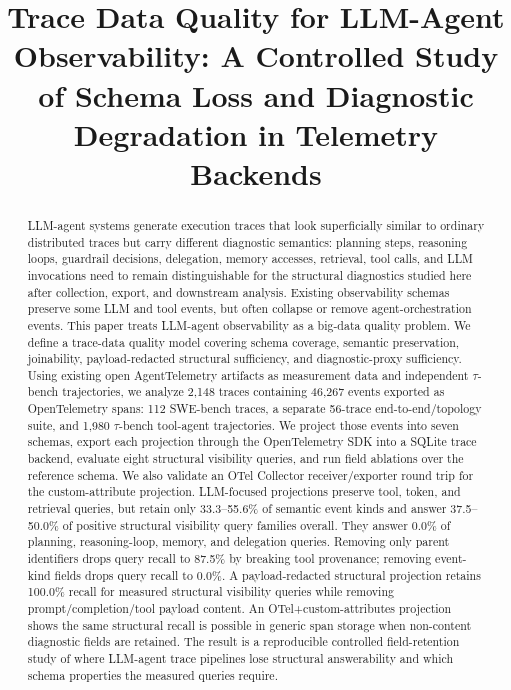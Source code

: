 \documentclass[conference]{IEEEtran}
\begin{document}
\title{Trace Data Quality for LLM-Agent Observability:
A Controlled Study of Schema Loss and Diagnostic
Degradation in Telemetry Backends}

\author{
}

\maketitle

\begin{abstract}
LLM-agent systems generate execution traces that look superficially
similar to ordinary distributed traces but carry different diagnostic
semantics: planning steps, reasoning loops, guardrail decisions,
delegation, memory accesses, retrieval, tool calls, and LLM invocations
need to remain distinguishable for the structural diagnostics studied
here after collection, export, and downstream analysis. Existing
observability schemas preserve some LLM and tool events, but often
collapse or remove agent-orchestration events. This paper treats
LLM-agent observability as a big-data quality problem. We define a
trace-data quality model covering schema coverage, semantic
preservation, joinability, payload-redacted structural sufficiency, and
diagnostic-proxy sufficiency. Using existing open AgentTelemetry
artifacts as measurement data and independent $\tau$-bench
trajectories, we analyze 2,148 traces containing 46,267 events exported
as OpenTelemetry spans: 112 SWE-bench traces, a separate 56-trace
end-to-end/topology suite, and 1,980 $\tau$-bench tool-agent
trajectories. We project those events into seven schemas, export each
projection through the OpenTelemetry SDK into a SQLite trace backend,
evaluate eight structural visibility queries, and run field ablations
over the reference schema. We also validate an OTel Collector
receiver/exporter round trip for the custom-attribute projection.
LLM-focused projections preserve tool, token, and retrieval queries, but
retain only 33.3--55.6\% of semantic event kinds and answer
37.5--50.0\% of positive structural visibility query families overall.
They answer 0.0\% of planning, reasoning-loop, memory, and delegation
queries. Removing only parent identifiers drops query recall to 87.5\%
by breaking tool provenance; removing event-kind fields drops query
recall to 0.0\%. A payload-redacted structural projection retains
100.0\% recall for measured structural visibility queries while removing
prompt/completion/tool payload content. An OTel+custom-attributes
projection shows the same structural recall is possible in generic span
storage when non-content diagnostic fields are retained. The result is a
reproducible controlled field-retention study of where LLM-agent trace
pipelines lose structural answerability and which schema properties the
measured queries require.
\end{abstract}
\end{document}
